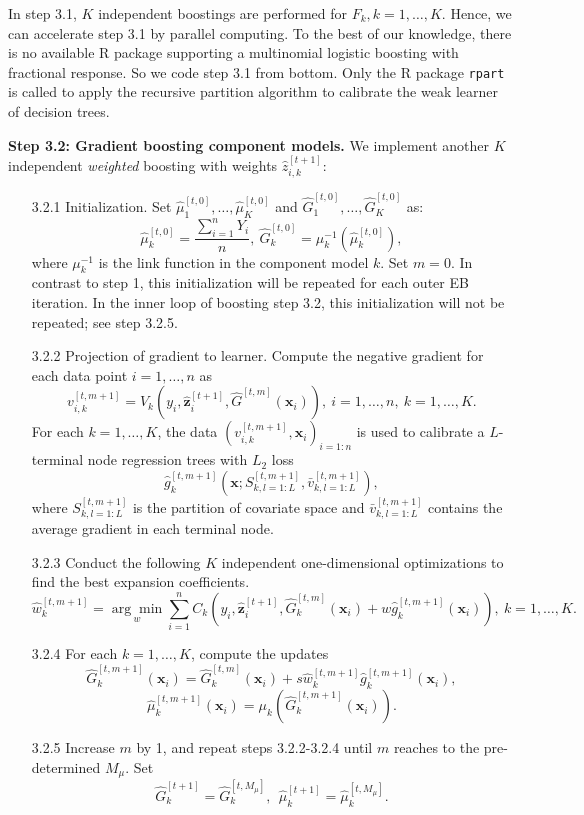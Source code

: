 \documentclass[11pt]{article}
\numberwithin{equation}{section}
\def\bx{\boldsymbol{x}}
\def\bz{\boldsymbol{z}}
\newcounter{saveenumi}
\newcommand{\seti}{\setcounter{saveenumi}{\value{enumi}}}
\begin{document}
In step 3.1, $K$ independent boostings are performed for $F_k, k=1,\ldots,K$. Hence, we can accelerate  step 3.1 by parallel computing.
To the best of our knowledge, there is no available R package supporting a  multinomial logistic boosting with fractional response.
So we code step 3.1 from bottom. Only the  R package {\tt rpart} is called to apply the recursive partition algorithm to calibrate the weak learner of decision trees.

{\bf Step 3.2: Gradient boosting component models.} We implement another $K$ independent {\it weighted} boosting with weights $\hat{z}_{i,k}^{[t+1]}$:
	\begin{enumerate}
		\item[3.2.1] Initialization. Set $\hat{\mu}_1^{[t,0]},\ldots,\hat{\mu}_K^{[t,0]}$ and $\hat{G}_1^{[t,0]},\ldots,\hat{G}_K^{[t,0]}$ as:
			\begin{equation}\label{ini-2}
				\hat{\mu}_k^{[t,0]}=\frac{\sum_{i=1}^nY_i}{n},~ \hat{G}_k^{[t,0]}=\mu_k^{-1}(\hat{\mu}_k^{[t,0]}),
					\end{equation}
		where $\mu^{-1}_k$ is the link function in the component model $k$. 
		Set $m=0$.
		In contrast to step 1, this initialization will be repeated for each outer EB iteration.
		In the inner loop of boosting step 3.2, this initialization will not be repeated; see step 3.2.5. 
		\item[3.2.2] Projection of gradient to learner.
		Compute the negative gradient for each data point $i=1,\ldots,n$ as 
		$$v_{i,k}^{[t,m+1]}=V_k(y_i,\hat{\bz}^{[t+1]}_{i},\hat{G}^{[t,m]}(\bx_i)),~ i=1,\ldots,n, ~k=1,\ldots,K.$$
		For each $k=1,\ldots,K$, the data $(v_{i,k}^{[t,m+1]},\bx_i)_{i=1:n}$ is used to calibrate a $L$-terminal node regression trees with $L_2$ loss $$\hat{g}_k^{[t,m+1]}\left(\bx;S^{[t,m+1]}_{k,l=1:L},\bar{v}^{[t,m+1]}_{k,l=1:L}\right),$$
		 where $S^{[t,m+1]}_{k,l=1:L}$ is the partition of covariate space and $\bar{v}^{[t,m+1]}_{k,l=1:L}$ contains the average gradient in each terminal node.
		
		\item[3.2.3]  Conduct the following $K$ independent one-dimensional optimizations to find the best expansion coefficients.
		$$\hat{w}_{k}^{[t,m+1]}=\underset{w}{\arg\min}\sum_{i=1}^n C_{k}(y_i,\hat{\bz}_i^{[t+1]},\hat{G}_k^{[t,m]}(\bx_i)+w\hat{g}_k^{[t,m+1]}(\bx_i)), ~ k=1,\ldots,K.$$
		
		\item[3.2.4]  For each $k=1,\ldots,K$, compute the updates
		$$\hat{G}_k^{[t,m+1]}(\bx_i)=\hat{G}_k^{[t,m]}(\bx_i)+s\hat{w}_{k}^{[t,m+1]}\hat{g}_{k}^{[t,m+1]}(\bx_i),$$
		$$\hat{\mu}_k^{[t,m+1]}(\bx_i)=\mu_k(\hat{G}_k^{[t,m+1]}(\bx_i)).$$
		\seti


		\item[3.2.5] Increase $m$ by 1, and repeat steps 3.2.2-3.2.4 until $m$ reaches to the pre-determined $M_\mu$. Set
		$$\hat{G}_k^{[t+1]}=\hat{G}_k^{[t,M_\mu]},~~\hat{\mu}_k^{[t+1]}=\hat{\mu}_k^{[t,M_\mu]}.$$
	\end{enumerate}
\end{document}
